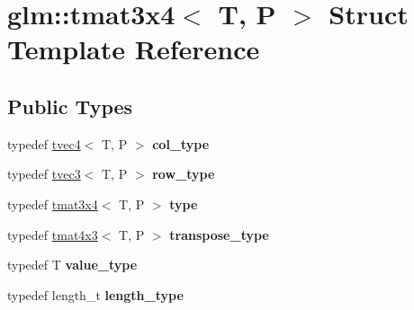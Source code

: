 \hypertarget{structglm_1_1tmat3x4}{}\section{glm\+:\+:tmat3x4$<$ T, P $>$ Struct Template Reference}
\label{structglm_1_1tmat3x4}
\subsection*{Public Types}
\begin{DoxyCompactItemize}
\item 
\mbox{\label{structglm_1_1tmat3x4_aa4c8d5353d59216a2f0566ce462fbc81}} 
typedef \hyperlink{structglm_1_1tvec4}{tvec4}$<$ T, P $>$ {\bfseries col\+\_\+type}
\item 
\mbox{\label{structglm_1_1tmat3x4_a8caa6e2dff35705a17659ac64c6b6782}} 
typedef \hyperlink{structglm_1_1tvec3}{tvec3}$<$ T, P $>$ {\bfseries row\+\_\+type}
\item 
\mbox{\label{structglm_1_1tmat3x4_a5af4a499991893e6f02750a29572fd9a}} 
typedef \hyperlink{structglm_1_1tmat3x4}{tmat3x4}$<$ T, P $>$ {\bfseries type}
\item 
\mbox{\label{structglm_1_1tmat3x4_a2ebc6db4342208ffbd1f3c643bcd81e2}} 
typedef \hyperlink{structglm_1_1tmat4x3}{tmat4x3}$<$ T, P $>$ {\bfseries transpose\+\_\+type}
\item 
\mbox{\label{structglm_1_1tmat3x4_a027b8d0c3639472d209b40f4cbe2361e}} 
typedef T {\bfseries value\+\_\+type}
\item 
\mbox{\label{structglm_1_1tmat3x4_ab857d16b90719de3b23d4fa423d20698}} 
typedef length\+\_\+t {\bfseries length\+\_\+type}
\end{DoxyCompactItemize}
